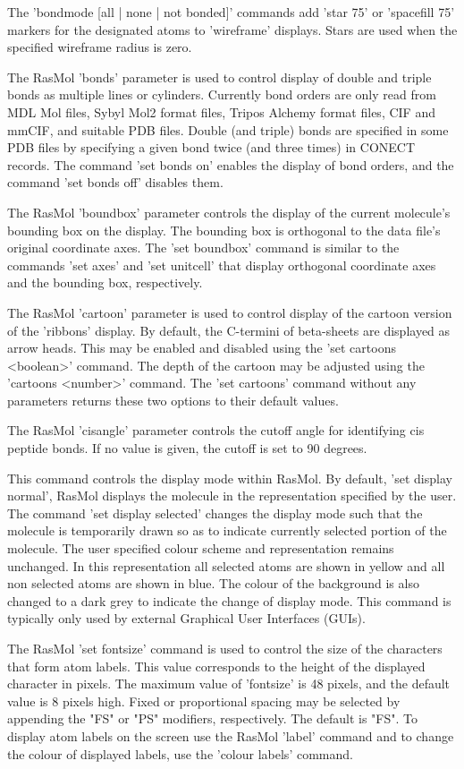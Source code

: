 The
'bondmode [all | none | not bonded]'
commands add
'star 75'
or
'spacefill 75'
markers for the designated atoms to
'wireframe'
displays.  Stars are used when the specified wireframe radius is zero.

The RasMol
'bonds'
parameter is used to control display of double and triple bonds as
multiple  lines or cylinders.  Currently bond orders are only read
from  MDL Mol files, Sybyl Mol2 format files, Tripos Alchemy format
files, CIF and mmCIF,  and suitable PDB files.  Double (and triple)  bonds
are specified in some  PDB files by specifying a given bond twice  (and
three times) in CONECT records.  The  command
'set bonds on'
enables the display of bond orders, and  the command
'set bonds off'
disables them.

The RasMol
'boundbox'
parameter controls the display of the current molecule's bounding box
on the display. The bounding box is orthogonal to the data file's
original coordinate axes. The
'set boundbox'
command is similar to the commands
'set axes'
and
'set unitcell'
that display orthogonal coordinate axes and the bounding box,
respectively.

The RasMol
'cartoon'
parameter is used to control display of the cartoon version of the
'ribbons'
display.  By default, the C-termini of beta-sheets are displayed as
arrow heads. This may be enabled and disabled using the
'set cartoons <boolean>'
command. The depth of the cartoon may be adjusted using the
'cartoons <number>'
command. The
'set cartoons'
command without any parameters returns these two options to
 their default values.

The RasMol
'cisangle'
parameter controls the cutoff angle for identifying cis peptide
 bonds.  If no value is given, the cutoff is set to 90 degrees.

This command controls the display mode within RasMol. By default,
'set display normal',
RasMol displays the molecule in the representation specified by the
user. The command
'set display selected'
changes the display mode such that the molecule is temporarily drawn
so as to indicate currently selected portion of the molecule. The
user specified colour scheme and representation remains unchanged.
In this representation all selected atoms are shown in yellow and
all non selected atoms are shown in blue. The colour of the background
is also changed to a dark grey to indicate the change of display mode.
This command is typically only used by external Graphical User
Interfaces (GUIs).

The RasMol
'set fontsize'
command is used to control the size of the characters that
form atom labels. This value corresponds to the height of
the displayed character in pixels. The maximum value of
'fontsize'
is 48 pixels, and the default value is 8 pixels high.
Fixed or proportional spacing may be selected by appending the
"FS" or "PS" modifiers, respectively.  The default is "FS".
To display atom labels on the screen use the RasMol
'label'
command and to change the colour of displayed labels, use
the
'colour labels'
command.

